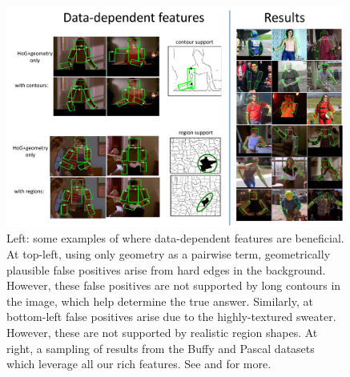 \begin{figure}[tb]
\begin{center}
\includegraphics[width=0.99\textwidth]{figs/cps-results-teaser.pdf}
\caption[Beneficial CPS features.]{Left: some examples of where data-dependent 
features are beneficial. At top-left, using only geometry as a pairwise term, 
geometrically plausible false positives arise from hard edges in the 
background.  However, these false positives are not supported by long contours 
in the image, which help determine the true answer.  Similarly, at bottom-left 
false positives arise due to the highly-textured sweater.  However, these are 
not supported by realistic region shapes.  At right, a sampling of results from 
the Buffy and Pascal datasets which leverage all our rich features.  See 
 and  for more.}
\label{fig:cps-results-teaser}
\end{center}
\end{figure}


